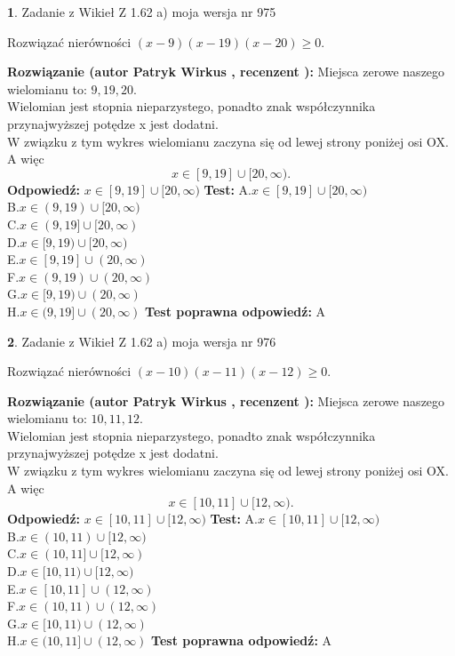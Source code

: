 \documentclass[12pt, a4paper]{article}
\theoremstyle{definition} %
\newtheorem{zad}{}
\newcommand{\zadStart}[1]{\begin{zad}#1\newline}
\newcommand{\zadStop}{\end{zad}}
\newcommand{\rozwStart}[2]{\noindent \textbf{Rozwiązanie (autor #1 , recenzent #2): }\newline}
\newcommand{\rozwStop}{\newline}
\newcommand{\odpStart}{\noindent \textbf{Odpowiedź:}\newline}
\newcommand{\odpStop}{\newline}
\newcommand{\testStart}{\noindent \textbf{Test:}\newline}
\newcommand{\testStop}{\newline}
\newcommand{\kluczStart}{\noindent \textbf{Test poprawna odpowiedź:}\newline}
\newcommand{\kluczStop}{\newline}
\begin{document}
\zadStart{Zadanie z Wikieł Z 1.62 a) moja wersja nr 975}

Rozwiązać nierówności $(x-9)(x-19)(x-20)\ge0$.
\zadStop
\rozwStart{Patryk Wirkus}{}
Miejsca zerowe naszego wielomianu to: $9, 19, 20$.\\
Wielomian jest stopnia nieparzystego, ponadto znak współczynnika przy\linebreak najwyższej potędze x jest dodatni.\\ W związku z tym wykres wielomianu zaczyna się od lewej strony poniżej osi OX. A więc $$x \in [9,19] \cup [20,\infty).$$
\rozwStop
\odpStart
$x \in [9,19] \cup [20,\infty)$
\odpStop
\testStart
A.$x \in [9,19] \cup [20,\infty)$\\
B.$x \in (9,19) \cup [20,\infty)$\\
C.$x \in (9,19] \cup [20,\infty)$\\
D.$x \in [9,19) \cup [20,\infty)$\\
E.$x \in [9,19] \cup (20,\infty)$\\
F.$x \in (9,19) \cup (20,\infty)$\\
G.$x \in [9,19) \cup (20,\infty)$\\
H.$x \in (9,19] \cup (20,\infty)$
\testStop
\kluczStart
A
\kluczStop



\zadStart{Zadanie z Wikieł Z 1.62 a) moja wersja nr 976}

Rozwiązać nierówności $(x-10)(x-11)(x-12)\ge0$.
\zadStop
\rozwStart{Patryk Wirkus}{}
Miejsca zerowe naszego wielomianu to: $10, 11, 12$.\\
Wielomian jest stopnia nieparzystego, ponadto znak współczynnika przy\linebreak najwyższej potędze x jest dodatni.\\ W związku z tym wykres wielomianu zaczyna się od lewej strony poniżej osi OX. A więc $$x \in [10,11] \cup [12,\infty).$$
\rozwStop
\odpStart
$x \in [10,11] \cup [12,\infty)$
\odpStop
\testStart
A.$x \in [10,11] \cup [12,\infty)$\\
B.$x \in (10,11) \cup [12,\infty)$\\
C.$x \in (10,11] \cup [12,\infty)$\\
D.$x \in [10,11) \cup [12,\infty)$\\
E.$x \in [10,11] \cup (12,\infty)$\\
F.$x \in (10,11) \cup (12,\infty)$\\
G.$x \in [10,11) \cup (12,\infty)$\\
H.$x \in (10,11] \cup (12,\infty)$
\testStop
\kluczStart
A
\kluczStop
\end{document}
